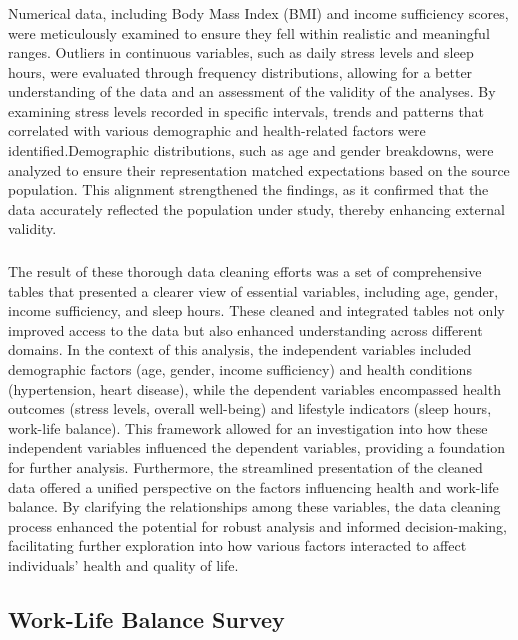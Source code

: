 \documentclass[runningheads]{llncs}
\begin{document}
\begin{enumerate}
\subsubsection{}
Numerical data, including Body Mass Index (BMI) and income sufficiency scores, were meticulously examined to ensure they fell within realistic and meaningful ranges. Outliers in continuous variables, such as daily stress levels and sleep hours, were evaluated through frequency distributions, allowing for a better understanding of the data and an assessment of the validity of the analyses. By examining stress levels recorded in specific intervals, trends and patterns that correlated with various demographic and health-related factors were identified.Demographic distributions, such as age and gender breakdowns, were analyzed to ensure their representation matched expectations based on the source population. This alignment strengthened the findings, as it confirmed that the data accurately reflected the population under study, thereby enhancing external validity.

\subsubsection{}

The result of these thorough data cleaning efforts was a set of comprehensive tables that presented a clearer view of essential variables, including age, gender, income sufficiency, and sleep hours. These cleaned and integrated tables not only improved access to the data but also enhanced understanding across different domains. In the context of this analysis, the independent variables included demographic factors (age, gender, income sufficiency) and health conditions (hypertension, heart disease), while the dependent variables encompassed health outcomes (stress levels, overall well-being) and lifestyle indicators (sleep hours, work-life balance). This framework allowed for an investigation into how these independent variables influenced the dependent variables, providing a foundation for further analysis. Furthermore, the streamlined presentation of the cleaned data offered a unified perspective on the factors influencing health and work-life balance. By clarifying the relationships among these variables, the data cleaning process enhanced the potential for robust analysis and informed decision-making, facilitating further exploration into how various factors interacted to affect individuals’ health and quality of life.

\subsection{Work-Life Balance Survey}


\end{enumerate}
\end{document}
